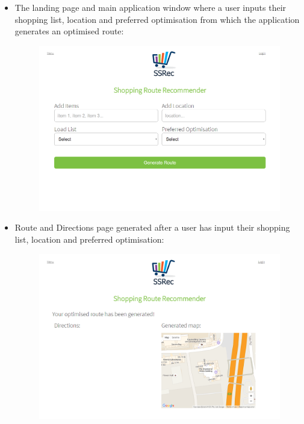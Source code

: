 \documentclass[10pt, a4paper, twocolumn]{scrartcl}
\begin{document}
\begin{itemize}
				\item The landing page and main application window where a user inputs their shopping list, location and preferred optimisation from which the application generates an optimised route:
				\begin{figure}[h!]
					\centering
					\includegraphics[scale = 0.5]{Images/index.PNG}
					\label{menu}
				\end{figure}
				
				\item Route and Directions page generated after a user has input their shopping list, location and preferred optimisation:
				\begin{figure}[h!]
					\centering
					\includegraphics[scale = 0.5]{Images/routeGen.PNG}
					\label{menu}
				\end{figure}
				

\end{itemize}
\end{document}
